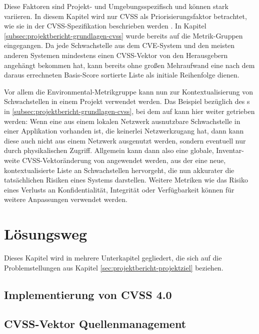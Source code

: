 Diese Faktoren sind Projekt- und Umgebungsspezifisch und können stark variieren.
In diesem Kapitel wird nur CVSS als Priorisierungsfaktor betrachtet, wie sie in der CVSS-Spezifikation beschrieben werden .
In Kapitel \ref{subsec:projektbericht-grundlagen-cvss} wurde bereits auf die Metrik-Gruppen eingegangen.
Da jede Schwachstelle aus dem CVE-System und den meisten anderen Systemen mindestens einen CVSS-Vektor von den Herausgebern angehängt bekommen hat, kann bereits ohne großen Mehraufwand eine nach dem daraus errechneten Basis-Score sortierte Liste als initiale Reihenfolge dienen.

Vor allem die Environmental-Metrikgruppe kann nun zur Kontextualisierung von Schwachstellen in einem Projekt verwendet werden.
Das Beispiel bezüglich des s in \ref{subsec:projektbericht-grundlagen-cvss}, bei dem  auf  kann hier weiter getrieben werden:
Wenn eine aus einem lokalen Netzwerk ausnutzbare Schwachstelle in einer Applikation vorhanden ist, die keinerlei Netzwerkzugang hat, dann kann diese auch nicht aus einem Netzwerk ausgenutzt werden, sondern eventuell nur durch physikalischen Zugriff.
Allgemein kann dann also eine globale, Inventar-weite CVSS-Vektoränderung von  angewendet werden, aus der eine neue, kontextualisierte Liste an Schwachstellen hervorgeht, die nun akkurater die tatsächlichen Risiken eines Systems darstellen.
Weitere Metriken wie das Risiko eines Verlusts an Konfidentialität, Integrität oder Verfügbarkeit können für weitere Anpassungen verwendet werden.




\section{Lösungsweg} \label{sec:projektbericht-loesungsweg}

Dieses Kapitel wird in mehrere Unterkapitel gegliedert, die sich auf die Problemstellungen aus Kapitel \ref{sec:projektbericht-projektziel} beziehen.

\subsection{Implementierung von CVSS 4.0} \label{subsec:projektbericht-loesungsweg-cvss-4-implementierung}

\subsection{CVSS-Vektor Quellenmanagement} \label{subsec:projektbericht-loesungsweg-cvss-source-management}

